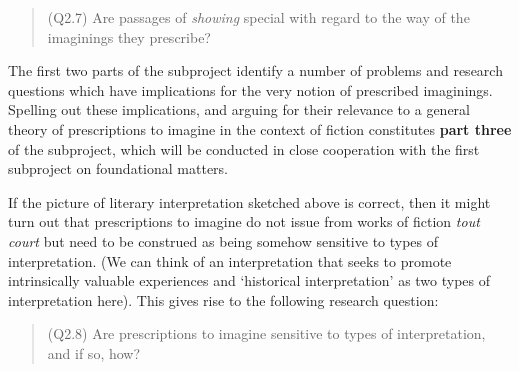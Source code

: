 \vspace{-.2cm}
\begin{quote}
(Q2.7) Are passages of \emph{showing} special with regard to the way
of the imaginings they prescribe?
\end{quote}
\vspace{-.2cm}

\noindent The first two parts of the subproject identify a number of problems and
research questions which have implications for the very notion of
prescribed imaginings. Spelling out these implications, and arguing for
their relevance to a general theory of prescriptions to imagine in the
context of fiction constitutes \textbf{part three} of the subproject,
which will be conducted in close cooperation with the {first subproject
on foundational matters}.

 If the picture of literary interpretation sketched above is correct,
then it might turn out that prescriptions to imagine do not issue from
works of fiction \emph{tout court} but need to be construed as being
somehow sensitive to types of interpretation. (We can think of an
interpretation that seeks to promote intrinsically valuable experiences
and `historical interpretation' as two types of interpretation here).
This gives rise to the following research question:

\vspace{-.2cm}
\begin{quote}
(Q2.8)  Are prescriptions to imagine sensitive to types of
interpretation, and if so, how?
\end{quote}
\vspace{-.2cm}

